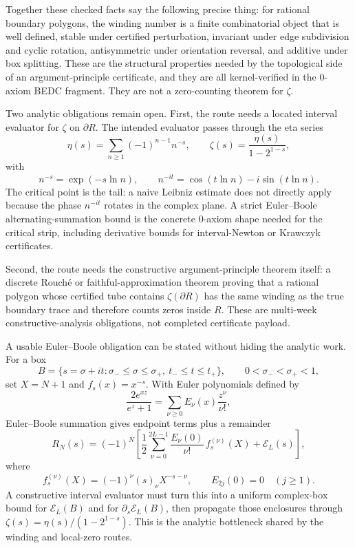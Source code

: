Together these checked facts say the following precise thing: for rational
boundary polygons, the winding number is a finite combinatorial object that is
well defined, stable under certified perturbation, invariant under edge
subdivision and cyclic rotation, antisymmetric under orientation reversal, and
additive under box splitting. These are the structural properties needed by
the topological side of an argument-principle certificate, and they are all
kernel-verified in the 0-axiom BEDC fragment. They are not a zero-counting
theorem for $\zeta$.

\begin{principle}
\label{prin:rh-winding-open-analytic-bridges}
Two analytic obligations remain open. First, the route needs a located
interval evaluator for $\zeta$ on $\partial R$. The intended evaluator passes
through the eta series
$$
\eta(s)=\sum_{n\geq1}(-1)^{n-1}n^{-s},
\qquad
\zeta(s)=\frac{\eta(s)}{1-2^{1-s}},
$$
with
$$
n^{-s}=\exp(-s\ln n),
\qquad
n^{-it}=\cos(t\ln n)-i\sin(t\ln n).
$$
The critical point is the tail: a naive Leibniz estimate does not directly
apply because the phase $n^{-it}$ rotates in the complex plane. A strict
Euler--Boole alternating-summation bound is the concrete 0-axiom shape needed
for the critical strip, including derivative bounds for interval-Newton or
Krawczyk certificates.

Second, the route needs the constructive argument-principle theorem itself:
a discrete Rouch\'e or faithful-approximation theorem proving that a rational
polygon whose certified tube contains $\zeta(\partial R)$ has the same winding
as the true boundary trace and therefore counts zeros inside $R$. These are
multi-week constructive-analysis obligations, not completed certificate
payload.
\end{principle}

A usable Euler--Boole obligation can be stated without hiding the analytic
work. For a box
$$
B=\{s=\sigma+it:\sigma_-\leq\sigma\leq\sigma_+,\ t_-\leq t\leq t_+\},
\qquad 0<\sigma_-<\sigma_+<1,
$$
set $X=N+1$ and $f_s(x)=x^{-s}$. With Euler polynomials defined by
$$
\frac{2e^{xz}}{e^z+1}
=
\sum_{\nu\geq0}E_\nu(x)\frac{z^\nu}{\nu!},
$$
Euler--Boole summation gives endpoint terms plus a remainder
$$
R_N(s)
=
(-1)^N
\left[
\frac12\sum_{\nu=0}^{2L-1}
\frac{E_\nu(0)}{\nu!}\,
f_s^{(\nu)}(X)
+\mathcal E_L(s)
\right],
$$
where
$$
f_s^{(\nu)}(X)=(-1)^\nu(s)_\nu X^{-s-\nu},
\qquad
E_{2j}(0)=0\quad(j\geq1).
$$
A constructive interval evaluator must turn this into a uniform complex-box
bound for $\mathcal E_L(B)$ and for $\partial_s\mathcal E_L(B)$, then propagate
those enclosures through $\zeta(s)=\eta(s)/(1-2^{1-s})$. This is the analytic
bottleneck shared by the winding and local-zero routes.

